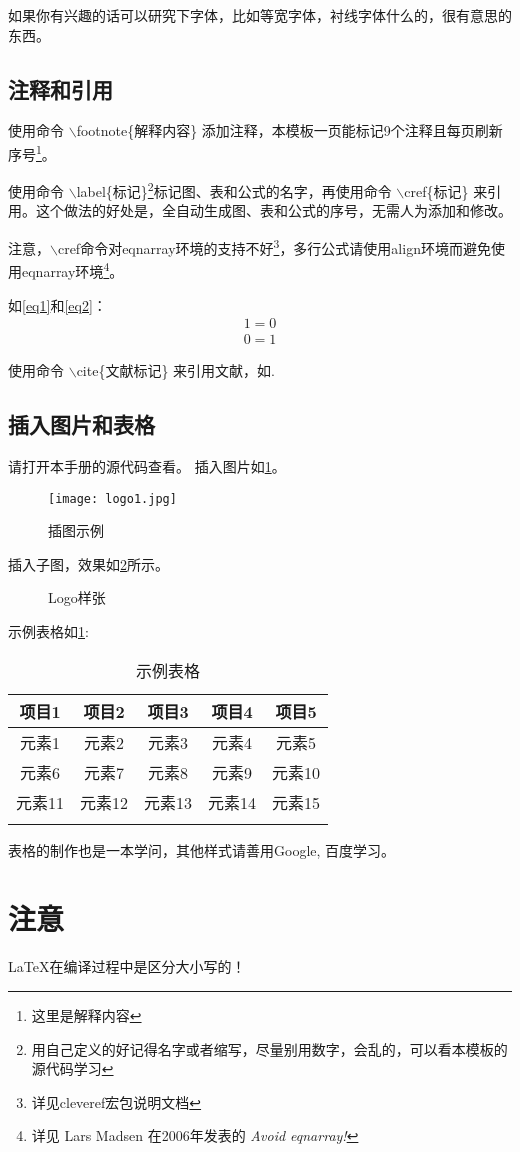 如果你有兴趣的话可以研究下字体，比如等宽字体，衬线字体什么的，很有意思的东西。

\subsection{注释和引用}
使用命令 $\backslash$footnote\{解释内容\} 添加注释，本模板一页能标记9个注释且每页刷新序号\footnote{这里是解释内容}。

使用命令 $\backslash$label\{标记\}\footnote{用自己定义的好记得名字或者缩写，尽量别用数字，会乱的，可以看本模板的源代码学习}标记图、表和公式的名字，再使用命令 $\backslash$cref\{标记\} 来引用。这个做法的好处是，全自动生成图、表和公式的序号，无需人为添加和修改。

注意，$\backslash$cref命令对eqnarray环境的支持不好\footnote{详见cleveref宏包说明文档}，多行公式请使用align环境而避免使用eqnarray环境\footnote{详见 Lars Madsen 在2006年发表的 \emph{Avoid eqnarray!} }。

如\cref{eq1}和\cref{eq2}：
\begin{align}
1=0\label{eq1}\\
0=1\label{eq2}
\end{align}

使用命令 $\backslash$cite\{文献标记\} 来引用文献，如\cite{yfbt}.

\subsection{插入图片和表格}
请打开本手册的源代码查看。
插入图片如\cref{fig.ex1}。
\begin{figure}[htbp]
	\centering\texttt{[image: logo1.jpg]}
	\caption{插图示例}\label{fig.ex1}
\end{figure}

插入子图，效果如\cref{fig.ex2}所示。
\begin{figure}[htbp]
	\centering
	\caption{Logo样张}
	\label{fig.ex2}
\end{figure}

示例表格如\cref{bg}:
\begin{longtable}{|c|c|c|c|c|}	
	\hline
	项目1 & 项目2 & 项目3 & 项目4 & 项目5 \\
	\hline
	\endhead
    元素1 & 元素2 & 元素3 & 元素4 & 元素5 \\
    \hline
    元素6 & 元素7 & 元素8 & 元素9 & 元素10 \\
    \hline
    元素11 & 元素12 & 元素13 & 元素14 & 元素15 \\
    \hline
	\caption{示例表格\label{bg}}
\end{longtable}

表格的制作也是一本学问，其他样式请善用Google, 百度学习。

\section{注意}
\LaTeX 在编译过程中是区分大小写的！



